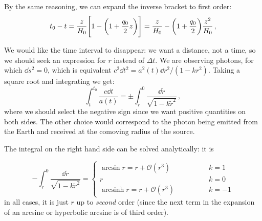 \documentclass[main.tex]{subfiles}
\begin{document}
By the same reasoning, we can expand the inverse bracket to first order: 
%
\begin{align} \label{eq:time-difference-wrt-redshift}
t_0 - t = \frac{z}{H_0 } \qty[1 - \qty(1 + \frac{q_0}{2} z)]
= \frac{z}{H_0 } - \qty(1 + \frac{q_0}{2}) \frac{z^2}{H_0 }
\,,
\end{align}
%


We would like the time interval to disappear: we want a distance, not a time, so we should seek an expression for \(r\) instead of \(\Delta t\).
We are observing photons, for which \(\dd{s^2} =0\), which is equivalent \(c^2 \dd{t^2} = a^2 (t) \dd{r^2} / (1-kr^2) \).
Taking a square root and integrating we get:
\begin{equation}
\int_{t}^{t_0 } \frac{c \dd{t}}{a(t)}
= \pm \int_r^0 \frac{\dd{\widetilde{r}}}{\sqrt{1-k \widetilde{r}^2}}
\,,
\end{equation}
%
where we should select the negative sign since we want positive quantities on both sides. The other choice would correspond to the photon being emitted from the Earth and received at the comoving radius of the source. 

The integral on the right hand side can be solved analytically: it is 

\begin{equation} \label{eq:integral-radial-FLRW}
-\int_{r}^{0} \frac{ \dd{\widetilde{r}}}{\sqrt{1 - k \widetilde{r}^2}} =
\begin{cases}
  \arcsin r =r + \mathcal{O}(r^3) &k =1 \\
  r  &k=0 \\
  \operatorname{arcsinh} r =r + \mathcal{O}(r^3)\qquad\qquad  &k= -1
\end{cases}
\end{equation}
%
in all cases, it is just \(r\) up to \emph{second} order (since the next term in the expansion of an arcsine or hyperbolic arcsine is of third order).
\end{document}
